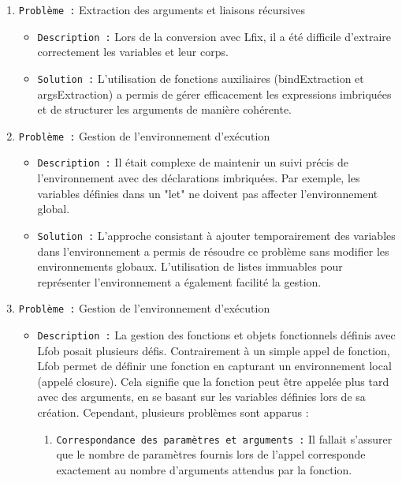 \documentclass{article}
\begin{document}
\begin{enumerate}
    \item \texttt{Problème :} Extraction des arguments et liaisons récursives
        \begin{itemize}
            \item \texttt{Description :} Lors de la conversion avec Lfix, il a été difficile d’extraire correctement les variables et leur corps.
            \item \texttt{Solution :} L’utilisation de fonctions auxiliaires (bindExtraction et argsExtraction) a permis de gérer efficacement les expressions imbriquées et de structurer les arguments de manière cohérente.
        \end{itemize}
        
    \item \texttt{Problème :} Gestion de l'environnement d’exécution
        \begin{itemize}
            \item \texttt{Description :} Il était complexe de maintenir un suivi précis de l’environnement avec des déclarations imbriquées. Par exemple, les variables définies dans un "let" ne doivent pas affecter l’environnement global.
            \item \texttt{Solution :} L’approche consistant à ajouter temporairement des variables dans l’environnement a permis de résoudre ce problème sans modifier les environnements globaux. L’utilisation de listes immuables pour représenter l'environnement a également facilité la gestion.
        \end{itemize}
    \item \texttt{Problème :} Gestion de l'environnement d’exécution
        \begin{itemize}
            \item \texttt{Description :} La gestion des fonctions et objets fonctionnels définis avec Lfob posait plusieurs défis. Contrairement à un simple appel de fonction, Lfob permet de définir une fonction en capturant un environnement local (appelé closure). Cela signifie que la fonction peut être appelée plus tard avec des arguments, en se basant sur les variables définies lors de sa création. Cependant, plusieurs problèmes sont apparus :
                \begin{enumerate}[label=\roman*.]
                    \item \texttt{Correspondance des paramètres et arguments :} Il fallait s'assurer que le nombre de paramètres fournis lors de l’appel corresponde exactement au nombre d'arguments attendus par la fonction.

\end{enumerate}
\end{itemize}
\end{enumerate}
\end{document}
